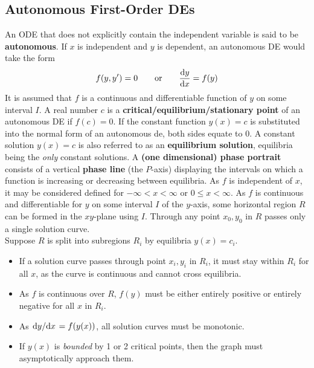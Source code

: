 \documentclass[./Differential Equations.tex]{subfiles}
\begin{document}
		\subsection{Autonomous First-Order DEs}
				An ODE that does not explicitly contain the independent variable is said to be \textbf{autonomous}. If \(x\) is independent and \(y\) is dependent, an autonomous DE would take the form
					\[f(y, y') = 0 \qquad \text{or} \qquad \dv{y}{x} = f(y)\]
					It is assumed that \(f\) is a  continuous and differentiable function of \(y\) on some interval \(I\).
				A real number \(c\) is a \textbf{critical/equilibrium/stationary point} of an autonomous DE if \(f(c) = 0\). If the constant function \(y(x) = c\) is substituted into the normal form of an autonomous de, both sides equate to 0.
				A constant solution \(y(x) = c\) is also referred to as an \textbf{equilibrium solution}, equilibria being the \textit{only} constant solutions.
				A \textbf{(one dimensional) phase portrait} consists of a vertical \textbf{phase line} (the \(P\)-axis) displaying the intervals on which a function is increasing or decreasing between equilibria.
				As \(f\) is independent of \(x\), it may be considered defined for \(-\infty < x < \infty\) or \(0 \le x < \infty\). As \(f\) is continuous and differentiable for \(y\) on some interval \(I\) of the \(y\)-axis, some horizontal region \(R\) can be formed in the \(xy\)-plane using \(I\). Through any point \(x_0, y_0\) in \(R\) passes only a single solution curve. \\
				Suppose \(R\) is split into subregions \(R_i\) by equilibria \(y(x) = c_i\). 
				\begin{itemize}
					\item
						If a solution curve passes through point \(x_i, y_i\) in \(R_i\), it must stay within \(R_i\) for all \(x\), as the curve is continuous and cannot cross equilibria.
					\item
						As \(f\) is continuous over \(R\), \(f(y)\) must be either entirely positive or entirely negative for all \(x\) in \(R_i\).
					\item
						As \(\dv*{y}{x} = f(y(x))\), all solution curves must be monotonic.
					\item
						If \(y(x)\) is \textit{bounded} by 1 or 2 critical points, then the graph must asymptotically approach them.
				\end{itemize}
\end{document}
